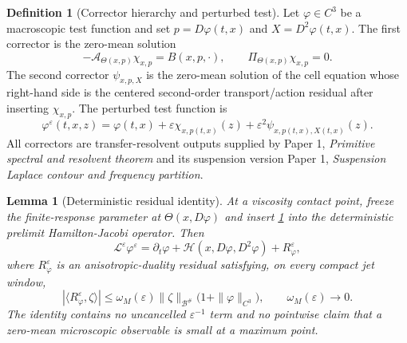 \documentclass[11pt]{amsart}
\newtheorem{lemma}[theorem]{Lemma}
\theoremstyle{definition}
\newtheorem{definition}[theorem]{Definition}
\theoremstyle{remark}
\newcommand{\Hcal}{\mathcal H}
\newcommand{\Bcal}{\mathcal B}
\newcommand{\Acal}{\mathcal A}
\newcommand{\PaperOne}[2]{Paper 1, \emph{#1}}
\begin{document}
\begin{definition}[Corrector hierarchy and perturbed test]
\label{def:corrector_hierarchy}
Let $\varphi\in C^3$ be a macroscopic test function and set
$p=D\varphi(t,x)$ and $X=D^2\varphi(t,x)$.  The first corrector is the zero-mean
solution
\begin{equation}
  -\Acal_{\Theta(x,p)}\chi_{x,p}=B(x,p,\cdot),
  \qquad \Pi_{\Theta(x,p)}\chi_{x,p}=0.
\end{equation}
The second corrector $\psi_{x,p,X}$ is the zero-mean solution of the cell
equation whose right-hand side is the centered second-order transport/action
residual after inserting $\chi_{x,p}$.  The perturbed test function is
\begin{equation}
  \varphi^\varepsilon(t,x,z)
  =\varphi(t,x)+\varepsilon\chi_{x,p(t,x)}(z)
  +\varepsilon^2\psi_{x,p(t,x),X(t,x)}(z).
\end{equation}
All correctors are transfer-resolvent outputs supplied by
\PaperOne{Primitive spectral and resolvent theorem}{thm:primitive_spectral_resolvent}
and its suspension version
\PaperOne{Suspension Laplace contour and frequency partition}{lem:suspension_laplace_contour}.
\end{definition}

\begin{lemma}[Deterministic residual identity]
\label{lem:deterministic_residual_identity}
At a viscosity contact point, freeze the finite-response parameter at
$\Theta(x,D\varphi)$ and insert
\cref{def:corrector_hierarchy} into the deterministic prelimit
Hamilton-Jacobi operator.  Then
\begin{equation}
  \mathcal L^\varepsilon\varphi^\varepsilon
  =
  \partial_t\varphi+\Hcal(x,D\varphi,D^2\varphi)+R^\varepsilon_\varphi,
\end{equation}
where $R^\varepsilon_\varphi$ is an anisotropic-duality residual satisfying, on
every compact jet window,
\begin{equation}
  |\langle R^\varepsilon_\varphi,\zeta\rangle|
  \le \omega_M(\varepsilon)
  \|\zeta\|_{\Bcal^\#}
  \bigl(1+\|\varphi\|_{C^3}\bigr),
  \qquad \omega_M(\varepsilon)\to0 .
\end{equation}
The identity contains no uncancelled $\varepsilon^{-1}$ term and no pointwise
claim that a zero-mean microscopic observable is small at a maximum point.
\end{lemma}
\end{document}
